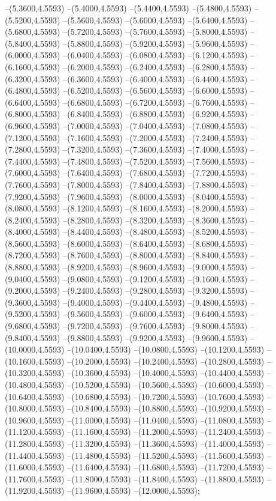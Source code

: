{	--(5.3600,4.5593)
	--(5.4000,4.5593)
	--(5.4400,4.5593)
	--(5.4800,4.5593)
	--(5.5200,4.5593)
	--(5.5600,4.5593)
	--(5.6000,4.5593)
	--(5.6400,4.5593)
	--(5.6800,4.5593)
	--(5.7200,4.5593)
	--(5.7600,4.5593)
	--(5.8000,4.5593)
	--(5.8400,4.5593)
	--(5.8800,4.5593)
	--(5.9200,4.5593)
	--(5.9600,4.5593)
	--(6.0000,4.5593)
	--(6.0400,4.5593)
	--(6.0800,4.5593)
	--(6.1200,4.5593)
	--(6.1600,4.5593)
	--(6.2000,4.5593)
	--(6.2400,4.5593)
	--(6.2800,4.5593)
	--(6.3200,4.5593)
	--(6.3600,4.5593)
	--(6.4000,4.5593)
	--(6.4400,4.5593)
	--(6.4800,4.5593)
	--(6.5200,4.5593)
	--(6.5600,4.5593)
	--(6.6000,4.5593)
	--(6.6400,4.5593)
	--(6.6800,4.5593)
	--(6.7200,4.5593)
	--(6.7600,4.5593)
	--(6.8000,4.5593)
	--(6.8400,4.5593)
	--(6.8800,4.5593)
	--(6.9200,4.5593)
	--(6.9600,4.5593)
	--(7.0000,4.5593)
	--(7.0400,4.5593)
	--(7.0800,4.5593)
	--(7.1200,4.5593)
	--(7.1600,4.5593)
	--(7.2000,4.5593)
	--(7.2400,4.5593)
	--(7.2800,4.5593)
	--(7.3200,4.5593)
	--(7.3600,4.5593)
	--(7.4000,4.5593)
	--(7.4400,4.5593)
	--(7.4800,4.5593)
	--(7.5200,4.5593)
	--(7.5600,4.5593)
	--(7.6000,4.5593)
	--(7.6400,4.5593)
	--(7.6800,4.5593)
	--(7.7200,4.5593)
	--(7.7600,4.5593)
	--(7.8000,4.5593)
	--(7.8400,4.5593)
	--(7.8800,4.5593)
	--(7.9200,4.5593)
	--(7.9600,4.5593)
	--(8.0000,4.5593)
	--(8.0400,4.5593)
	--(8.0800,4.5593)
	--(8.1200,4.5593)
	--(8.1600,4.5593)
	--(8.2000,4.5593)
	--(8.2400,4.5593)
	--(8.2800,4.5593)
	--(8.3200,4.5593)
	--(8.3600,4.5593)
	--(8.4000,4.5593)
	--(8.4400,4.5593)
	--(8.4800,4.5593)
	--(8.5200,4.5593)
	--(8.5600,4.5593)
	--(8.6000,4.5593)
	--(8.6400,4.5593)
	--(8.6800,4.5593)
	--(8.7200,4.5593)
	--(8.7600,4.5593)
	--(8.8000,4.5593)
	--(8.8400,4.5593)
	--(8.8800,4.5593)
	--(8.9200,4.5593)
	--(8.9600,4.5593)
	--(9.0000,4.5593)
	--(9.0400,4.5593)
	--(9.0800,4.5593)
	--(9.1200,4.5593)
	--(9.1600,4.5593)
	--(9.2000,4.5593)
	--(9.2400,4.5593)
	--(9.2800,4.5593)
	--(9.3200,4.5593)
	--(9.3600,4.5593)
	--(9.4000,4.5593)
	--(9.4400,4.5593)
	--(9.4800,4.5593)
	--(9.5200,4.5593)
	--(9.5600,4.5593)
	--(9.6000,4.5593)
	--(9.6400,4.5593)
	--(9.6800,4.5593)
	--(9.7200,4.5593)
	--(9.7600,4.5593)
	--(9.8000,4.5593)
	--(9.8400,4.5593)
	--(9.8800,4.5593)
	--(9.9200,4.5593)
	--(9.9600,4.5593)
	--(10.0000,4.5593)
	--(10.0400,4.5593)
	--(10.0800,4.5593)
	--(10.1200,4.5593)
	--(10.1600,4.5593)
	--(10.2000,4.5593)
	--(10.2400,4.5593)
	--(10.2800,4.5593)
	--(10.3200,4.5593)
	--(10.3600,4.5593)
	--(10.4000,4.5593)
	--(10.4400,4.5593)
	--(10.4800,4.5593)
	--(10.5200,4.5593)
	--(10.5600,4.5593)
	--(10.6000,4.5593)
	--(10.6400,4.5593)
	--(10.6800,4.5593)
	--(10.7200,4.5593)
	--(10.7600,4.5593)
	--(10.8000,4.5593)
	--(10.8400,4.5593)
	--(10.8800,4.5593)
	--(10.9200,4.5593)
	--(10.9600,4.5593)
	--(11.0000,4.5593)
	--(11.0400,4.5593)
	--(11.0800,4.5593)
	--(11.1200,4.5593)
	--(11.1600,4.5593)
	--(11.2000,4.5593)
	--(11.2400,4.5593)
	--(11.2800,4.5593)
	--(11.3200,4.5593)
	--(11.3600,4.5593)
	--(11.4000,4.5593)
	--(11.4400,4.5593)
	--(11.4800,4.5593)
	--(11.5200,4.5593)
	--(11.5600,4.5593)
	--(11.6000,4.5593)
	--(11.6400,4.5593)
	--(11.6800,4.5593)
	--(11.7200,4.5593)
	--(11.7600,4.5593)
	--(11.8000,4.5593)
	--(11.8400,4.5593)
	--(11.8800,4.5593)
	--(11.9200,4.5593)
	--(11.9600,4.5593)
	--(12.0000,4.5593);
}
\def\allca{
\lockdownca \Sca \Rca \Ica
\draw[color=red,line width=0.5pt] (0,1.0000)--(12,1.0000);
\node[color=red] at (0,1.0000) [above right] {$I_0=0.200$};
\node at (3,5.3) [above] {$\beta = 0.60$};
\node at (9,5.3) [above] {$\gamma = 0.20$};
}
